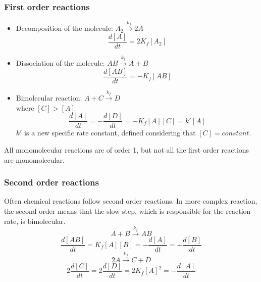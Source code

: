 \documentclass[12pt]{article}
\begin{document}
\subsubsection{First order reactions}

\begin{itemize}
    \item Decomposition of the molecule: $A_{2}\xrightarrow{k_{f}} 2A$
    \begin{equation}
        \frac{d[A]}{dt}=2K_{f}[A_{2}]
    \end{equation}
    \item Dissociation of the molecule:
    $AB\xrightarrow{k_{f}} A+B$
    \begin{equation}
        \frac{d[AB]}{dt}=-K_{f}[AB]
    \end{equation}
    \item Bimolecular reaction:
    $A+C\xrightarrow{k_{f}} D$ \\where $[C]>[A]$
    \begin{equation}
        \frac{d[A]}{dt}=-\frac{d[D]}{dt}=-K_{f}[A][C]=k'[A]
    \end{equation}
    $k'$ is a new specific rate constant, defined considering that $[C]=constant$.
\end{itemize}
All monomolecular reactions are of order 1, but not all the first order reactions are monomolecular.

\subsubsection{Second order reactions}

Often chemical reactions follow second order reactions. In more complex reaction, the second order means that the slow step, which is responsible for the reaction rate, is bimolecular.
\begin{equation}
 A+B\xrightarrow{k_{f}} AB
\end{equation}
    \begin{equation}
        \frac{d[AB]}{dt}=K_{f}[A][B]=-\frac{d[A]}{dt}=-\frac{d[B]}{dt}
    \end{equation}
\begin{equation}
   2A\xrightarrow{k_{f}} C+D
\end{equation}
    \begin{equation}
        2\frac{d[C]}{dt}=2\frac{d[D]}{dt}=2K_{f}[A]^{2}=-\frac{d[A]}{dt}
    \end{equation}
\end{document}
